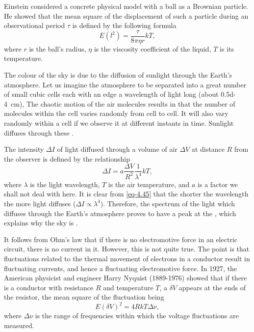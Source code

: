 Einstein considered a concrete physical model with a ball as a Brownian particle. He showed that the mean square of the displacement of such a particle during an observational period $\tau$ is defined by the following formula
\begin{equation}%
E(l^{2}) = \frac{\tau}{8 \pi \eta r} k T,
\label{eq-4.44}
\end{equation}
where $r$ is the ball's radius, $\eta$ is the viscosity coefficient of the liquid, $T$ is its temperature.

 The colour of the sky is due to the diffusion of sunlight through the Earth's atmosphere. Let us imagine the atmosphere to be separated into a great number of small cubic cells each with an edge a wavelength of light long (about \SI{0.5d-4}{\centi\meter}), The chaotic motion of the air molecules results in that the number of molecules within the cell varies randomly from cell to cell. It will also vary randomly within a cell if we observe it at different instants in time. Sunlight diffuses through these .

The intensity $\Delta I$ of light diffused through a volume of air $\Delta V$ at distance $R$ from the observer is defined by the relationship
\begin{equation}%
\Delta I = a \frac{\Delta V}{R^{2}} \frac{1}{\lambda^{4}} kT,
\label{eq-4.45}
\end{equation}
where $\lambda$ is the light wavelength, $T$ is the air temperature, and $a$ is a factor we shall not deal with here. It is clear from \eqref{eq-4.45} that the shorter the wavelength the more light diffuses ($\Delta I \propto \lambda^{4}
$). Therefore, the spectrum of the light which diffuses through the Earth's atmosphere proves to have a peak at the , which explains why the sky is .

 It follows from Ohm's law that if there is no electromotive force in an electric circuit, there is no current in it. However, this is not quite true. The point is that fluctuations related to the thermal movement of electrons in a conductor result in fluctuating currents, and hence a fluctuating electromotive force. In 1927, the American physicist and engineer Harry Nyquist (1889-1976) showed that if there is a conductor with resistance $R$ and temperature $T$, a  $\delta V$ appears at the ends of the resistor, the mean square of the fluctuation being
\begin{equation}%
E(\delta V)^{2} = 4 R k T \Delta \nu,
\label{eq-4.46}
\end{equation}
where $\Delta \nu $ is the range of frequencies within which the voltage fluctuations are measured.

